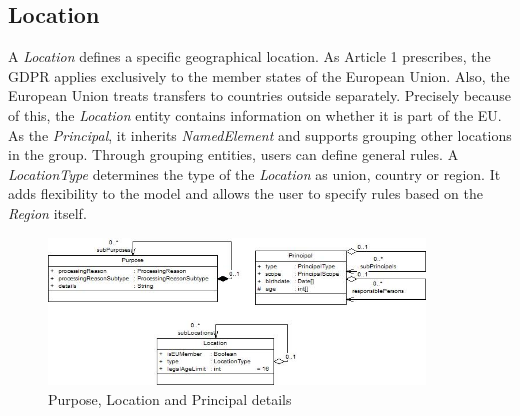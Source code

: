 \documentclass[11pt,english]{article}
\begin{document}
\subsection{Location}
A \emph{Location} defines a specific geographical location. As Article 1 prescribes, the GDPR applies exclusively to the member states of the European Union. Also, the European Union treats transfers to countries outside separately. Precisely because of this, the \emph{Location} entity contains information on whether it is part of the EU. As the \emph{Principal}, it inherits \emph{NamedElement} and supports grouping other locations in the group. Through grouping entities, users can define general rules. A \emph{LocationType} determines the type of the \emph{Location} as union, country or region. It adds flexibility to the model and allows the user to specify rules based on the  \emph{Region} itself.
\begin{figure}[H]
    \centering
    \includegraphics[width=10cm,scale=0.5]{images/purposeAndPrincipal.jpg}
    \caption{Purpose, Location and Principal details}
    \label{fig:purpose}
\end{figure}
\end{document}
